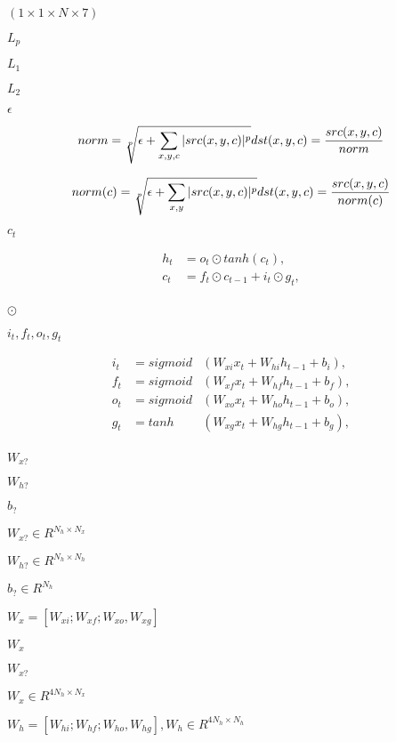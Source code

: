 \documentclass{article}
\begin{document}
$ (1 \times 1 \times N \times 7) $
\pagebreak

$ L_p $
\pagebreak

$ L_1 $
\pagebreak

$ L_2 $
\pagebreak

$ \epsilon $
\pagebreak

\[ norm = \sqrt[p]{\epsilon + \sum_{x, y, c} |src(x, y, c)|^p } \\ dst(x, y, c) = \frac{ src(x, y, c) }{norm} \]
\pagebreak

\[ norm(c) = \sqrt[p]{\epsilon + \sum_{x, y} |src(x, y, c)|^p } \\ dst(x, y, c) = \frac{ src(x, y, c) }{norm(c)} \]
\pagebreak

$c_t$
\pagebreak

\begin{eqnarray*} h_t &= o_t \odot tanh(c_t), \\ c_t &= f_t \odot c_{t-1} + i_t \odot g_t, \\ \end{eqnarray*}
\pagebreak

$\odot$
\pagebreak

$i_t, f_t, o_t, g_t$
\pagebreak

\begin{eqnarray*} i_t &= sigmoid&(W_{xi} x_t + W_{hi} h_{t-1} + b_i), \\ f_t &= sigmoid&(W_{xf} x_t + W_{hf} h_{t-1} + b_f), \\ o_t &= sigmoid&(W_{xo} x_t + W_{ho} h_{t-1} + b_o), \\ g_t &= tanh &(W_{xg} x_t + W_{hg} h_{t-1} + b_g), \\ \end{eqnarray*}
\pagebreak

$W_{x?}$
\pagebreak

$W_{h?}$
\pagebreak

$b_{?}$
\pagebreak

$W_{x?} \in R^{N_h \times N_x}$
\pagebreak

$W_{h?} \in R^{N_h \times N_h}$
\pagebreak

$b_? \in R^{N_h}$
\pagebreak

$ W_x = [W_{xi}; W_{xf}; W_{xo}, W_{xg}] $
\pagebreak

$W_x$
\pagebreak

$ W_{x?} $
\pagebreak

$ W_x \in R^{4N_h \times N_x} $
\pagebreak

$ W_h = [W_{hi}; W_{hf}; W_{ho}, W_{hg}], W_h \in R^{4N_h \times N_h} $
\pagebreak
\end{document}
